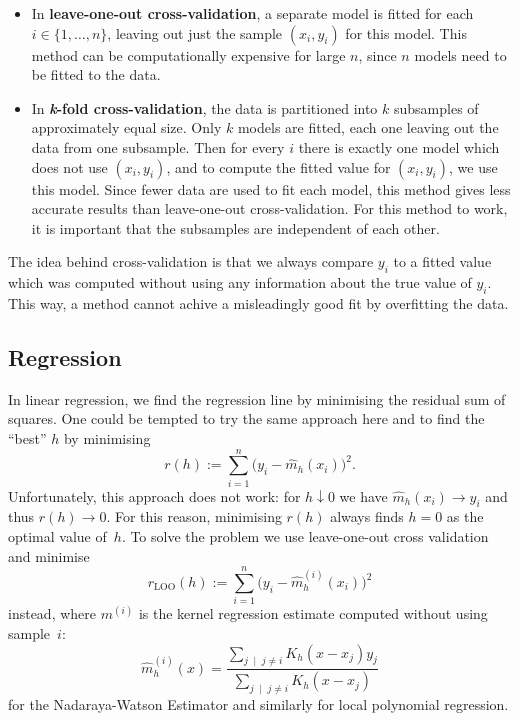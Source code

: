 \documentclass[
  a4paper,
]{article}
\theoremstyle{definition}
\theoremstyle{definition}
\theoremstyle{definition}
\theoremstyle{definition}
\theoremstyle{remark}
\begin{document}
\begin{itemize}
\item
  In \textbf{leave-one-out cross-validation}, a separate model is fitted
  for each \(i \in \{1, \ldots, n\}\), leaving out just the sample \((x_i, y_i)\)
  for this model. This method can be computationally
  expensive for large \(n\), since \(n\) models need to be fitted to the data.
\item
  In \textbf{\emph{k}-fold cross-validation}, the data is partitioned into
  \(k\) subsamples of approximately equal size. Only \(k\) models are fitted,
  each one leaving out the data from one subsample. Then for every \(i\)
  there is exactly one model which does not use \((x_i, y_i)\), and
  to compute the fitted value for \((x_i, y_i)\), we use this model.
  Since fewer data are used to fit each model, this method gives less
  accurate results than leave-one-out cross-validation.
  For this method to work, it is important that the subsamples
  are independent of each other.
\end{itemize}

The idea behind cross-validation is that we always compare \(y_i\) to
a fitted value which was computed without using any information about
the true value of \(y_i\). This way, a method cannot achive a misleadingly
good fit by overfitting the data.

\hypertarget{regression}{%
\subsection{Regression}\label{regression}}

In linear regression, we find the regression line by minimising
the residual sum of squares. One could be tempted to try the same
approach here and to find the ``best'' \(h\) by minimising
\begin{equation*}
  r(h)
  := \sum_{i=1}^n \bigl( y_i - \hat m_h(x_i) \bigr)^2.
\end{equation*}
Unfortunately, this approach does not work: for \(h \downarrow 0\)
we have \(\hat m_h(x_i) \to y_i\) and thus \(r(h) \to 0\). For this reason,
minimising \(r(h)\) always finds \(h=0\) as the optimal value of~\(h\).
To solve the problem we use leave-one-out cross validation and minimise
\begin{equation*}
  r_\mathrm{LOO}(h)
  := \sum_{i=1}^n \bigl( y_i - \hat m^{(i)}_h(x_i) \bigr)^2
\end{equation*}
instead,
where \(m^{(i)}\) is the kernel regression estimate computed without using
sample~\(i\):
\begin{equation*}
  \hat m_h^{(i)}(x)
  = \frac{\sum_{j \;\mid\; j\neq i} K_h(x - x_j)y_j}{\sum_{j \;\mid\; j\neq i}K_h(x - x_j)}
\end{equation*}
for the Nadaraya-Watson Estimator and similarly for local polynomial
regression.
\end{document}
